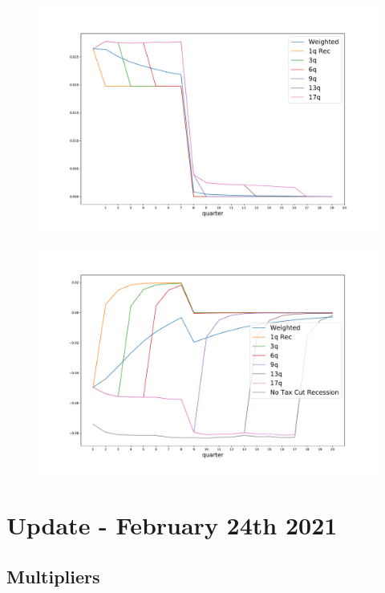 \documentclass[]{article}
\begin{document}
\begin{figure}
	\centering
	\includegraphics[width=\linewidth]{../Full_Run_Mar5/Tax_Cut_Rec_Decomp_Rel_Recession}
	\caption{}
	\label{fig:taxcutrecdecomprelrecession}
\end{figure}

\begin{figure}
	\centering
	\includegraphics[width=\linewidth]{../Full_Run_Mar5/Tax_Cut_Rec_Decomp_Rel_Baseline}
	\caption{}
	\label{fig:taxcutrecdecomprelbaseline}
\end{figure}


\FloatBarrier	
\section{Update - February 24th 2021}	
\FloatBarrier
\subsection{Multipliers}
\end{document}
